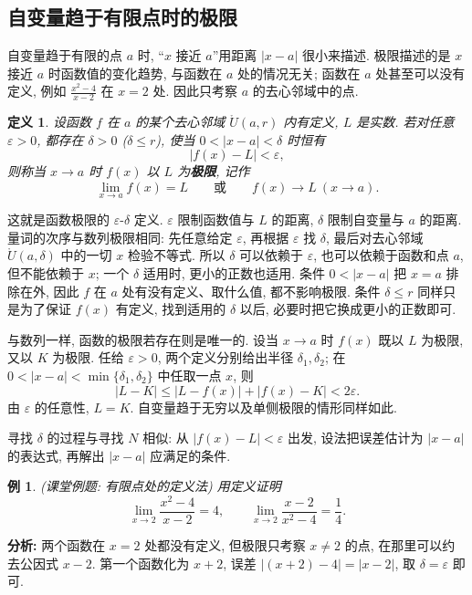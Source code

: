 \documentclass[UTF8,openany]{ctexbook}
\theoremstyle{chinesetextbook}
\newtheorem{definition}{定义}[section]
\newtheorem{example}{例}[section]
\begin{document}
\subsection{自变量趋于有限点时的极限}
自变量趋于有限的点 $a$ 时, “$x$ 接近 $a$”用距离 $|x-a|$ 很小来描述. 极限描述的是 $x$ 接近 $a$ 时函数值的变化趋势, 与函数在 $a$ 处的情况无关; 函数在 $a$ 处甚至可以没有定义, 例如 $\displaystyle\frac{x^2-4}{x-2}$ 在 $x=2$ 处. 因此只考察 $a$ 的去心邻域中的点.
\begin{definition}
设函数 $f$ 在 $a$ 的某个去心邻域 $\mathring U(a,r)$ 内有定义, $L$ 是实数. 若对任意 $\varepsilon>0$, 都存在 $\delta>0$ ($\delta\le r$), 使当 $0<|x-a|<\delta$ 时恒有
\[
|f(x)-L|<\varepsilon,
\]
则称当 $x\to a$ 时 $f(x)$ 以 $L$ 为\textbf{极限}, 记作
\[
\lim_{x\to a}f(x)=L\qquad\text{或}\qquad f(x)\to L\ (x\to a).
\]
\end{definition}
这就是函数极限的 $\varepsilon$-$\delta$ 定义. $\varepsilon$ 限制函数值与 $L$ 的距离, $\delta$ 限制自变量与 $a$ 的距离. 量词的次序与数列极限相同: 先任意给定 $\varepsilon$, 再根据 $\varepsilon$ 找 $\delta$, 最后对去心邻域 $\mathring U(a,\delta)$ 中的一切 $x$ 检验不等式. 所以 $\delta$ 可以依赖于 $\varepsilon$, 也可以依赖于函数和点 $a$, 但不能依赖于 $x$; 一个 $\delta$ 适用时, 更小的正数也适用. 条件 $0<|x-a|$ 把 $x=a$ 排除在外, 因此 $f$ 在 $a$ 处有没有定义、取什么值, 都不影响极限. 条件 $\delta\le r$ 同样只是为了保证 $f(x)$ 有定义, 找到适用的 $\delta$ 以后, 必要时把它换成更小的正数即可.

与数列一样, 函数的极限若存在则是唯一的. 设当 $x\to a$ 时 $f(x)$ 既以 $L$ 为极限, 又以 $K$ 为极限. 任给 $\varepsilon>0$, 两个定义分别给出半径 $\delta_1,\delta_2$; 在 $0<|x-a|<\min\{\delta_1,\delta_2\}$ 中任取一点 $x$, 则
\[
|L-K|\le|L-f(x)|+|f(x)-K|<2\varepsilon.
\]
由 $\varepsilon$ 的任意性, $L=K$. 自变量趋于无穷以及单侧极限的情形同样如此.

寻找 $\delta$ 的过程与寻找 $N$ 相似: 从 $|f(x)-L|<\varepsilon$ 出发, 设法把误差估计为 $|x-a|$ 的表达式, 再解出 $|x-a|$ 应满足的条件.
\begin{example}
\textnormal{(课堂例题: 有限点处的定义法)} 用定义证明
\[
\lim_{x\to2}\frac{x^2-4}{x-2}=4,\qquad\lim_{x\to2}\frac{x-2}{x^2-4}=\frac14.
\]
\end{example}
\par\indent\textbf{分析:} 两个函数在 $x=2$ 处都没有定义, 但极限只考察 $x\ne2$ 的点, 在那里可以约去公因式 $x-2$. 第一个函数化为 $x+2$, 误差 $|(x+2)-4|=|x-2|$, 取 $\delta=\varepsilon$ 即可.
\end{document}
